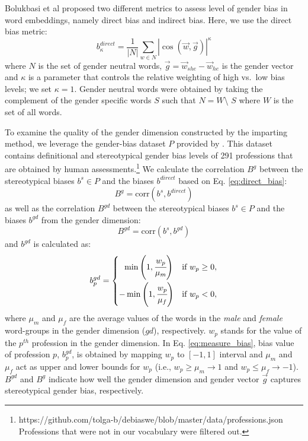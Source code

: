 \documentclass[11pt,a4paper]{article}
\begin{document}
Bolukbasi et al \citep{bolukbasi16debiasing} proposed two different metrics to assess level of gender bias in word embeddings, namely direct bias and indirect bias. Here, we use the direct bias metric:
\begin{equation}
b^{direct}_\kappa = \frac{1}{|N|}\sum_{w\in N}|\cos(\vec{w},\vec{g})|^\kappa
\label{eq:direct_bias}
\end{equation}
where $N$ is the set of gender neutral words,
$\vec{g}= \vec{w}_{she} - \vec{w}_{he}$ is the gender vector
and $\kappa$ is a parameter that
controls the relative weighting of high vs.\ low bias
levels; we set $\kappa=1$. Gender
neutral words were obtained by taking the complement of the
gender specific words $S$ such that $N = W$\textbackslash
$S$ where $W$ is the set of all words.

To examine the quality of the gender dimension constructed
by the imparting method, we leverage the gender-bias
dataset $P$ provided by \citet{bolukbasi16debiasing}. This
dataset contains definitional and stereotypical gender bias
levels of 291 professions that are obtained by human
assessments.\footnote{https://github.com/tolga-b/debiaswe/blob/master/data/professions.json\\Professions that were not in our vocabulary were filtered out.} 
We calculate the correlation $B^{g}$ between the stereotypical biases $b^s \in P$  and the biases
$b^{direct}$  based on Eq. \ref{eq:direct_bias}:
\begin{equation}
    B^{g} = \mbox{corr}(b^s,b^{direct})
    \label{eq:bg}
\end{equation}
as well as the correlation $B^{gd}$ between the stereotypical biases $b^s \in P$ and the biases
$b^{gd}$ from the gender dimension:
\begin{equation}
    B^{gd} = \mbox{corr}(b^s,b^{gd}) \label{eq:bgd}
\end{equation}
and $b^{gd}$ is calculated as:
\begin{align}
     b^{gd}_p = 
     \begin{cases}
		~~\min \left( 1, \cfrac{w_{p}}{\mu_m} \right) & \text{if } w_{p} \geq 0, \vspace{0.1cm} \\ 
		-\min \left( 1, \cfrac{w_{p}}{\mu_f} \right) & \text{if } w_{p} < 0,
	\end{cases}
	\label{eq:measure_bias}
\end{align}
where $\mu_m$ and $\mu_f$ are the average values of the
words in the \textit{male} and \textit{female} word-groups
in the gender dimension ($gd$), respectively. $w_p$ stands
for the value of the $p^{th}$ profession in the gender
dimension. In Eq. \ref{eq:measure_bias}, bias value of profession $p$, $b^{gd}_p$, is obtained by mapping $w_p$ to $[-1,1]$ interval and $\mu_m$ and $\mu_f$ act as upper and lower bounds for $w_p$ (i.e., $w_p \geq \mu_m \rightarrow 1$ and $w_p \leq \mu_f \rightarrow -1$). $B^{gd}$ and $B^g$ indicate how well the gender dimension and gender vector $\vec{g}$
captures stereotypical gender bias, respectively.
\end{document}
